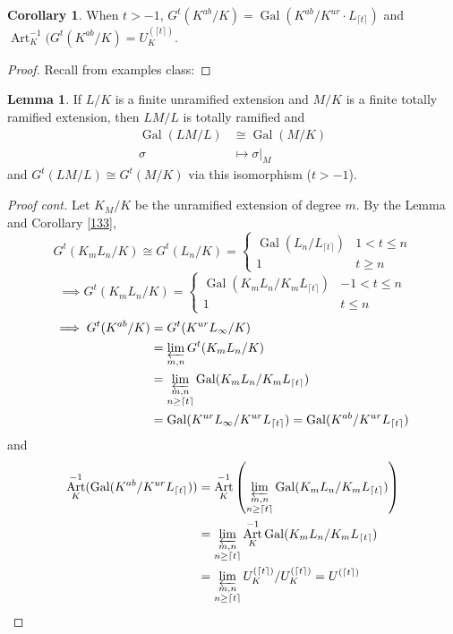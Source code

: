 \documentclass[a4paper]{article}
\theoremstyle{definition}
\theoremstyle{default}
\newtheorem{lemma}[definition]{Lemma}
\newtheorem{corollary}[definition]{Corollary}
\theoremstyle{remark}
\DeclareMathOperator{\Gal}{Gal}
\DeclareMathOperator{\Art}{Art}
\begin{document}
\begin{corollary}
	When $t>-1$,
	$G^t(K^{ab}/K) = \Gal(K^{ab}/K^{ur}\cdot L_{\lceil t \rceil})$
	and $\Art_K^{-1}(G^t(K^{ab}/K)=U_K^{(\lceil t \rceil)}$.
\end{corollary}
\begin{proof}\renewcommand{\qedsymbol}{}
	Recall from examples class:
\end{proof}
\begin{lemma}
	If $L/K$ is a finite unramified extension and $M/K$ is a finite totally ramified extension,
	then $LM/L$ is totally ramified and 
	\begin{align*}
		\Gal(LM/L) &\cong \Gal(M/K) \\
		\sigma &\mapsto \sigma|_M
	\end{align*}
	and $G^t(LM/L) \cong G^t(M/K)$ via this isomorphism ($t > -1$).
\end{lemma}
\begin{proof}[Proof cont]
	Let $K_M/K$ be the unramified extension of degree $m$.
	By the Lemma and Corollary \ref{133},
	$$G^t(K_mL_n/K) \cong G^t(L_n/K) = \begin{cases}
		\Gal(L_n/L_{\lceil t \rceil}) & 1 < t \leq n \\
		1 & t \geq n
	\end{cases}$$
	$$\implies G^t(K_mL_n/K) = \begin{cases}
		\Gal(K_mL_n/K_mL_{\lceil t \rceil}) & -1 < t \leq n \\
		1 & t \leq n
	\end{cases}$$
	\begin{align*}
		\implies G^t(K^{ab}/K) &= G^t(K^{ur}L_\infty/K) \\
		&= \varprojlim_{m,n} G^t(K_mL_n/K) \\
		&= \varprojlim_{\substack{m,n \\ n \geq \lceil t \rceil}} \Gal(K_mL_n/K_mL_{\lceil t \rceil}) \\
		&= \Gal(K^{ur}L_\infty/K^{ur}L_{\lceil t \rceil}) = \Gal(K^{ab}/K^{ur}L_{\lceil t \rceil})
	\end{align*}
	and 
	\begin{align*}
		\Art_K^{-1}(\Gal(K^{ab}/K^{ur}L_{\lceil t \rceil})) &= \Art_K^{-1}\left(\varprojlim_{\substack{m,n \\ n \geq \lceil t \rceil}}  \Gal(K_mL_n/K_mL_{\lceil t \rceil})\right) \\
		&= \varprojlim_{\substack{m,n \\ n \geq \lceil t \rceil}} \Art_K^{-1}\Gal(K_mL_n/K_mL_{\lceil t \rceil}) \\
		&= \varprojlim_{\substack{m,n \\ n \geq \lceil t \rceil}} U_K^{(\lceil t \rceil)}/U_K^{(\lceil t \rceil)} = U^{(\lceil t \rceil)}
	\end{align*}
\end{proof}
\end{document}
